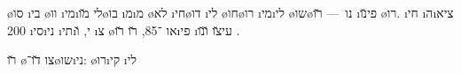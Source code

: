 \o{סו} \i{בי} \o{וו} \i{מי}\i{לי} \u{מו}\o{בו} \i{מ}\i{מ} \o{לא}   \i{חי}\o{דו} \i{לי} \o{חו}\o{רו}  \i{מי}\i{לי} \o{שו}\o{נו}~—  \u{רו} \i{פי}\u{נו} \o{רו}. \i{חי} \i{ה}\i{ציא} 200 \i{סי}\i{ני} \i{תי}\i{י}, \u{ו}  \i{צ} \o{או} ־85, \u{רו} \u{רו}\i{פי}  \i{עי}\u{צו}  \u{ו}\u{נו} .

%
{\u{רו} \o{צו} \u{דו}־\o{שו}\i{ני}: \o{רו}\i{קי} \i{לי}}
